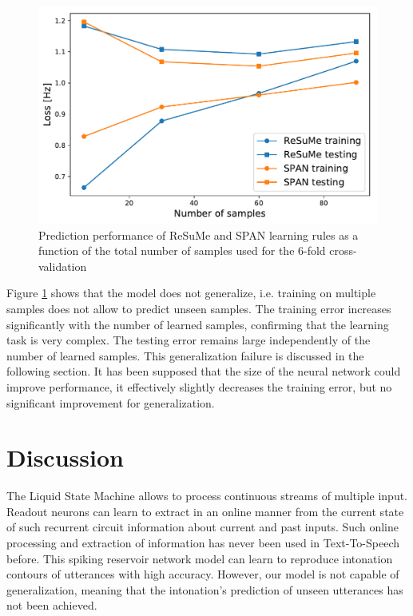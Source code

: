 \documentclass[11pt, a4paper]{article} %
\begin{document}
\begin{figure}
\centering
\includegraphics[scale=.7]{figures/CV.pdf}
\caption{Prediction performance of ReSuMe and SPAN learning rules as a function of the total number of samples used for the 6-fold cross-validation}
\label{multipleSample}
\end{figure}

Figure \ref{multipleSample} shows that the model does not generalize, i.e. training on multiple samples does not allow to predict unseen samples. The training error increases significantly with the number of learned samples, confirming that the learning task is very complex. The testing error remains large independently of the number of learned samples. This generalization failure is discussed in the following section. It has been supposed that the size of the neural network could improve performance, it effectively slightly decreases the training error, but no significant improvement for generalization.


\section{Discussion}



The Liquid State Machine allows to process continuous streams of multiple input. Readout neurons can learn to extract in an online manner from the current state of such recurrent circuit information about current and past inputs. Such online processing and extraction of information has never been used in Text-To-Speech before. This spiking reservoir network model can learn to reproduce intonation contours of utterances with high accuracy. However, our model is not capable of generalization, meaning that the intonation's prediction of unseen utterances has not been achieved.
\end{document}

